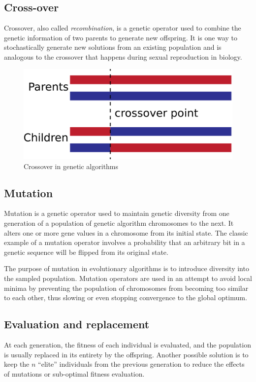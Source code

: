 \subsection{Cross-over}
Crossover, also called \textit{recombination}, is a genetic operator used to combine the genetic information of two parents to generate new offspring. It is one way to stochastically generate new solutions from an existing population and is analogous to the crossover that happens during sexual reproduction in biology.

\begin{figure}
    \centering
    \includegraphics[scale=0.15]{Images/Chapter 9/crossover.png}
    \caption{Crossover in genetic algorithms}
    \label{fig:ch9-crossover}
\end{figure}

\subsection{Mutation}
Mutation is a genetic operator used to maintain genetic diversity from one generation of a population of genetic algorithm chromosomes to the next. It alters one or more gene values in a chromosome from its initial state. The classic example of a mutation operator involves a probability that an arbitrary bit in a genetic sequence will be flipped from its original state.

The purpose of mutation in evolutionary algorithms is to introduce diversity into the sampled population. Mutation operators are used in an attempt to avoid local minima by preventing the population of chromosomes from becoming too similar to each other, thus slowing or even stopping convergence to the global optimum.

\subsection{Evaluation and replacement}
At each generation, the fitness of each individual is evaluated, and the population is usually replaced in its entirety by the offspring. Another possible solution is to keep the $n$ ``elite'' individuals from the previous generation to reduce the effects of mutations or sub-optimal fitness evaluation. 

